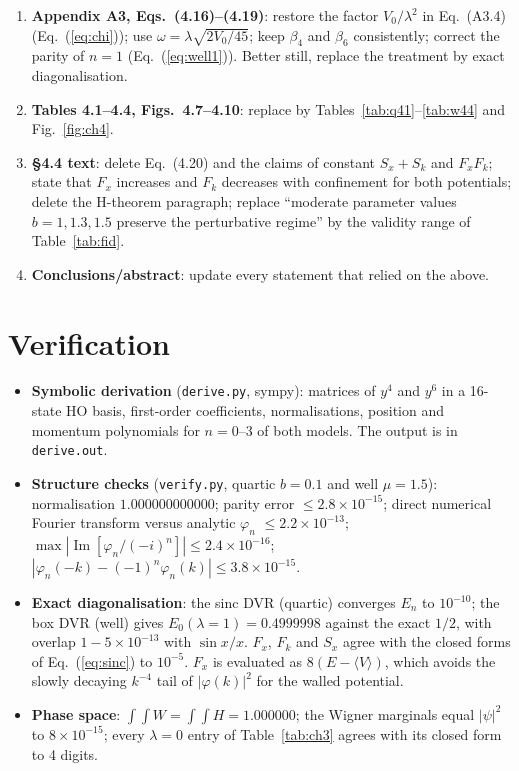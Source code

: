 \documentclass[11pt,a4paper]{article}
\newcommand{\Eq}[1]{Eq.~(#1)}
\begin{document}
\begin{enumerate}[label=\arabic*.,leftmargin=1.6em]
\item \textbf{Appendix A3, Eqs.~(4.16)--(4.19)}: restore the factor $V_0/\lambda^2$ in
  \Eq{A3.4} (\Eq{\ref{eq:chi}}); use $\omega=\lambda\sqrt{2V_0/45}$; keep $\beta_4$ and
  $\beta_6$ consistently; correct the parity of $n=1$ (\Eq{\ref{eq:well1}}). Better still,
  replace the treatment by exact diagonalisation.
\item \textbf{Tables 4.1--4.4, Figs.~4.7--4.10}: replace by
  Tables~\ref{tab:q41}--\ref{tab:w44} and Fig.~\ref{fig:ch4}.
\item \textbf{\S4.4 text}: delete \Eq{4.20} and the claims of constant $S_x+S_k$ and
  $F_xF_k$; state that $F_x$ increases and $F_k$ decreases with confinement for both
  potentials; delete the H-theorem paragraph; replace ``moderate parameter values
  $b=1,1.3,1.5$ preserve the perturbative regime'' by the validity range of
  Table~\ref{tab:fid}.
\item \textbf{Conclusions/abstract}: update every statement that relied on the above.
\end{enumerate}

\appendix
\section{Verification}
\label{app:verify}
\begin{itemize}
\item \textbf{Symbolic derivation} (\texttt{derive.py}, sympy): matrices of $y^4$ and $y^6$ in a
  16-state HO basis, first-order coefficients, normalisations, position and momentum
  polynomials for $n=0$--3 of both models. The output is in \texttt{derive.out}.
\item \textbf{Structure checks} (\texttt{verify.py}, quartic $b=0.1$ and well $\mu=1.5$): normalisation
  $1.000000000000$; parity error $\le2.8\times10^{-15}$; direct numerical Fourier transform
  versus analytic $\varphi_n$ $\le2.2\times10^{-13}$; $\max|\operatorname{Im}[\varphi_n/(-i)^n]|\le2.4\times10^{-16}$;
  $|\varphi_n(-k)-(-1)^n\varphi_n(k)|\le3.8\times10^{-15}$.
\item \textbf{Exact diagonalisation}: the sinc DVR (quartic) converges $E_n$ to $10^{-10}$; the
  box DVR (well) gives $E_0(\lambda=1)=0.4999998$ against the exact $1/2$, with overlap
  $1-5\times10^{-13}$ with $\sin x/x$. $F_x$, $F_k$ and $S_x$ agree with the closed forms of
  \Eq{\ref{eq:sinc}} to $10^{-5}$. $F_x$ is evaluated as $8(E-\langle V\rangle)$, which avoids
  the slowly decaying $k^{-4}$ tail of $|\varphi(k)|^2$ for the walled potential.
\item \textbf{Phase space}: $\int\!\!\int W=\int\!\!\int H=1.000000$; the Wigner marginals equal
  $|\psi|^2$ to $8\times10^{-15}$; every $\lambda=0$ entry of Table~\ref{tab:ch3} agrees with its
  closed form to 4 digits.
\end{itemize}
\end{document}
